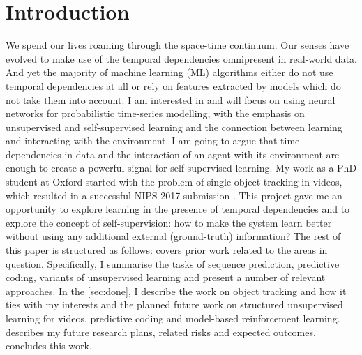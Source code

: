 \section{Introduction}

    We spend our lives roaming through the space-time continuum. Our senses have evolved to make use of the temporal dependencies omnipresent in real-world data. And yet the majority of machine learning (ML) algorithms either do not use temporal dependencies at all or rely on features extracted by models which do not take them into account.
    I am interested in and will focus on using neural networks for probabilistic time-series modelling, with the emphasis on unsupervised and self-supervised learning and the connection between learning and interacting with the environment.
    I am going to argue that time dependencies in data and the interaction of an agent with its environment are enough to create a powerful signal for self-supervised learning.
    My work as a PhD student at Oxford started with the problem of single object tracking in videos, which resulted in a successful NIPS 2017 submission \citep{Kosiorek2017}.    
    This project gave me an opportunity to explore learning in the presence of temporal dependencies and to explore the concept of self-supervision: how to make the system learn better without using any additional external (\eg ground-truth) information? 
    The rest of this paper is structured as follows:
     covers prior work related to the areas in question.
    Specifically, I summarise the tasks of sequence prediction, predictive coding, variants of unsupervised learning and present a number of relevant approaches.
    In the \cref{sec:done}, I describe the work on object tracking and how it ties with my interests and the planned future work on structured unsupervised learning for videos, predictive coding and model-based reinforcement learning.
     describes my future research plans, related risks and expected outcomes.
     concludes this work. 